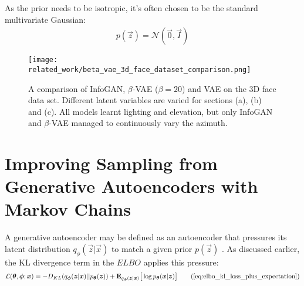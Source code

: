 As the prior needs to be isotropic, it's often chosen to be the standard multivariate Gaussian:
\begin{align}
p(\vec{z}) = \mathcal{N}(\vec{0}, \vec{I})
\end{align}

\begin{figure}[h!]
\centering
\captionsetup{justification=centering}
\texttt{[image: related\_work/beta\_vae\_3d\_face\_dataset\_comparison.png]}
\caption{A comparison of InfoGAN, $\beta$-VAE ($\beta = 20$) and VAE on the 3D face data set. Different latent variables are varied for sections (a), (b) and (c). All models learnt lighting and elevation, but only InfoGAN and $\beta$-VAE managed to continuously vary the azimuth. \cite{Thiagarajan2016}}
\label{fig:beta_vae_3d_face_dataset_comparison}
\end{figure}



%
%
%
%
%
\section{Improving Sampling from Generative Autoencoders with Markov Chains}

A generative autoencoder may be defined as an autoencoder that pressures its latent distribution $q_{\phi}(\vec{z} | \vec{x})$ to match a given prior $p(\vec{z})$ \cite{Creswell2016}. As discussed earlier, the KL divergence term in the $ELBO$ applies this pressure:
\begin{align}
\mathcal{L}(\vec{\theta}, \vec{\phi}; \vec{x}) = -D_{KL}(q_{\vec{\phi}}(\vec{z}|\vec{x}) || p_{\vec{\theta}}(\vec{z})) + \mathbf{E}_{q_{\vec{\phi}}(\vec{z}|\vec{x})}\big[\log p_{\vec{\theta}}(\vec{x} | \vec{z}) \big]
\tag{\ref{eq:elbo_kl_loss_plus_expectation}}
\end{align}

